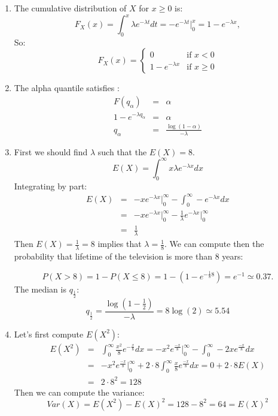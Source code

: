 \documentclass[12pt,thmsa]{article}\usepackage[]{graphicx}\usepackage[]{color}
\begin{document}
\begin{enumerate}
  \item The cumulative distribution of $X$ for  $x \geq 0$ is:
  \begin{equation*}
  F_X(x)= \int_0^x \lambda e^{-\lambda t} dt = -e^{-\lambda t} \bigg\vert_0^{x}= 1-e^{-\lambda x},
  \end{equation*}
  So:\begin{equation*}
  F_X(x) =
  \begin{cases}
   0                   & \text{if }  x < 0 \\
    1-e^{-\lambda x}      & \text{if } x \geq 0
  \end{cases}
  \end{equation*}
  \item The alpha quantile satisfies :
  \begin{eqnarray*}
    F(q_\alpha) &=& \alpha \\
    1-e^{-\lambda q_\alpha} &=& \alpha \\
    q_\alpha &=& \frac{\log(1-\alpha)}{-\lambda }
  \end{eqnarray*}
  \item First we should find $\lambda$ such that the $E(X)=8$.
\begin{equation*}
        E(X) = \int_0^\infty x \lambda e^{-\lambda x} dx
\end{equation*}
Integrating by part:
  \begin{eqnarray*}
    E(X) &=& -x e^{-\lambda x} \bigg\vert_0^{\infty} -\int_{0}^{\infty} -e^{-\lambda x} dx \\
     &=& -x e^{-\lambda x} \bigg\vert_0^{\infty} -    \frac{1}{\lambda} e^{-\lambda x} \bigg\vert_{0}^\infty \\
     &=& \frac{1}{\lambda}
  \end{eqnarray*}
 Then $E(X)=\frac{1}{\lambda}=8$ implies that $\lambda=\frac{1}{8}$.
 We can compute then the probability that lifetime of the television is more than 8 years:

 \begin{equation*}
    P(X>8)=1-P(X\leq 8)=1-(1-e^{-\frac{1}{8}8})=e^{-1}\simeq 0.37.
 \end{equation*}
 The median is $q_{\frac{1}{2}}$:
 \begin{equation*}
  q_{\frac{1}{2}} = \frac{\log(1-\frac{1}{2})}{-\lambda}=8\log(2) \simeq 5.54
 \end{equation*}
  \item Let's first compute $E(X^2)$:
  \begin{eqnarray*}
  E(X^2)&=& \int_{0}^{\infty} \frac{x^2}{8} e^{-\frac{x}{8}} dx = -x^2 e^{\frac{-x}{8}} \bigg\vert_{0}^{\infty} - \int_{0}^{\infty} -2x e^{\frac{-x}{8}}dx  \\
  &=& -x^2 e^{\frac{-x}{8}} \bigg\vert_{0}^{\infty} + 2\cdot 8 \int_{0}^{\infty} \frac{x}{8} e^{\frac{-x}{8}}dx=0 +2 \cdot 8 E(X) \\
  &=& 2\cdot 8^2=128
  \end{eqnarray*}
  Then we can compute the variance:
  \begin{equation*}
    Var(X)=E(X^2)-E(X)^2=128-8^2=64=E(X)^2
  \end{equation*}
\end{enumerate}
\end{document}
